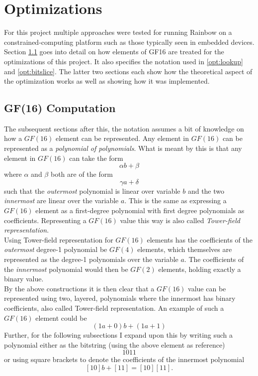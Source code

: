 \section{Optimizations} \label{opti}
For this project multiple approaches were tested for running Rainbow on a constrained-computing platform such as those typically seen in embedded devices. Section \ref{opt:gf16comp} goes into detail on how elements of GF16 are treated for the optimizations of this project. It also specifies the notation used in \cref{opt:lookup} and \cref{opt:bitslice}. The latter two sections each show how the theoretical aspect of the optimization works as well as showing how it was implemented.
\subsection{GF(16) Computation} \label{opt:gf16comp}
The subsequent sections after this, the notation assumes a bit of knowledge on how a $GF(16)$ element can be represented. Any element in $GF(16)$ can be represented as a \emph{polynomial of polynomials}. What is meant by this is that any element in $GF(16)$ can take the form
$$
    \alpha b + \beta
$$
where $\alpha$ and $\beta$ both are of the form 
$$
    \gamma a + \delta
$$
such that the \emph{outermost} polynomial is linear over variable $b$ and the two \emph{innermost} are linear over the variable $a$. This is the same as expressing a $GF(16)$ element as a first-degree polynomial with first degree polynomials as coefficients. Representing a $GF(16)$ value this way is also called \emph{Tower-field representation}.
\medskip\\
Using Tower-field representation for $GF(16)$ elements has the coefficients of the \emph{outermost} degree-1 polynomial be $GF(4)$ elements, which themselves are represented as the degree-1 polynomials over the variable $a$. The coefficients of the \emph{innermost} polynomial would then be $GF(2)$ elements, holding exactly a binary value.
\medskip\\
By the above constructions it is then clear that a $GF(16)$ value can be represented using two, layered, polynomials where the innermost has binary coefficients, also called Tower-field representation. An example of such a $GF(16)$ element could be
$$
    (1a + 0) b + (1a + 1)
$$
Further, for the following subsections I expand upon this by writing such a polynomial either as the bitstring (using the above element as reference)
$$
    1011
$$
or using square brackets to denote the coefficients of the innermost polynomial
$$
    [10]b + [11] = [10][11].
$$

